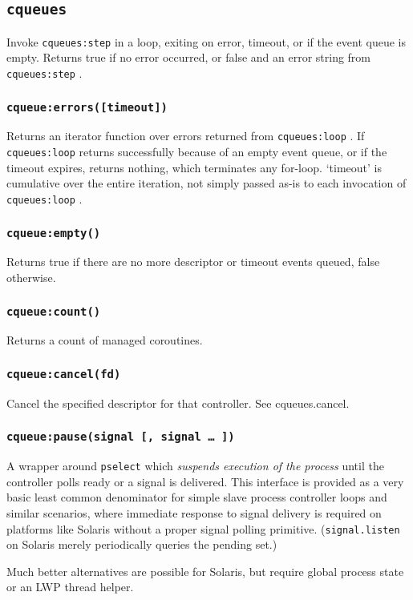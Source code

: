 \documentclass[11pt, oneside]{memoir}
\newcommand{\cqueues}[0]{\texttt{cqueues} }
\newcommand{\syscall}[1]{\texttt{#1} }
\newcommand{\routine}[1]{\texttt{#1} }
\newcommand{\method}[1]{\texttt{#1} }
\newcounter{toccols}
\newenvironment{Module}[1]{
	\subsection{\texttt{#1}}
	\addtocontents{toc}{
		\protect\begin{multicols}{\value{toccols}}
	}
}{
	\addtocontents{toc}{\protect\end{multicols}}
}
\begin{document}
\begin{Module}{\cqueues}
Invoke \method{cqueues:step} in a loop, exiting on error, timeout, or if the event queue is empty. Returns true if no error occurred, or false and an error string from \method{cqueues:step}.

\subsubsection[\routine{cqueues:errors}]{\routine{cqueue:errors([timeout])}}

Returns an iterator function over errors returned from \routine{cqueues:loop}. If \routine{cqueues:loop} returns successfully because of an empty event queue, or if the timeout expires, returns nothing, which terminates any for-loop. `timeout' is cumulative over the entire iteration, not simply passed as-is to each invocation of \routine{cqueues:loop}.

\subsubsection[\routine{cqueues:empty}]{\routine{cqueue:empty()}}
Returns true if there are no more descriptor or timeout events queued, false otherwise.

\subsubsection[\routine{cqueues:count}]{\routine{cqueue:count()}}
Returns a count of managed coroutines.

\subsubsection[\routine{cqueues:cancel}]{\routine{cqueue:cancel(fd)}}
Cancel the specified descriptor for that controller. See cqueues.cancel.

\subsubsection[\routine{cqueues:pause}]{\routine{cqueue:pause(signal [, signal … ])}}
A wrapper around \syscall{pselect} which \emph{suspends execution of the process} until the controller polls ready or a signal is delivered. This interface is provided as a very basic least common denominator for simple slave process controller loops and similar scenarios, where immediate response to signal delivery is required on platforms like Solaris without a proper signal polling primitive. (\routine{signal.listen} on Solaris merely periodically queries the pending set.)

Much better alternatives are possible for Solaris, but require global process state or an LWP thread helper.

\end{Module}
\end{document}
